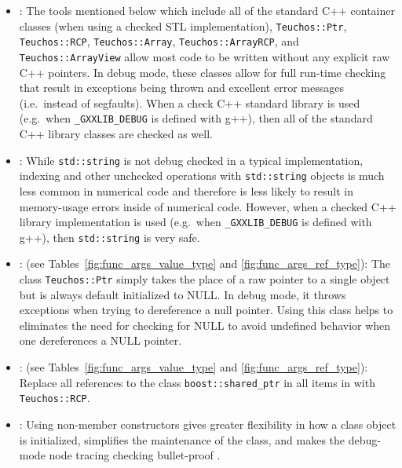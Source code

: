 \begin{itemize}


{}\item\GCGAvoidRawPointers: The tools mentioned below which include all of
the standard C++ container classes (when using a checked STL implementation),
{}\texttt{Teuchos::\-Ptr}, {}\texttt{Teuchos::\-RCP},
{}\texttt{Teuchos::\-Array}, {}\texttt{Teuchos::\-Array\-RCP}, and
{}\texttt{Teuchos::\-Array\-View} allow most code to be written without any
explicit raw C++ pointers.  In debug mode, these classes allow for full
run-time checking that result in exceptions being thrown and excellent error
messages (i.e.\ instead of segfaults).  When a check C++ standard library is
used (e.g.\ when {}\texttt{\_GXXLIB\_DEBUG} is defined with g++), then all of
the standard C++ library classes are checked as well.


{}\item\GCGUseStdString: While {}\texttt{std\-::string} is not debug checked
in a typical implementation, indexing and other unchecked operations with
{}\texttt{std\-::string} objects is much less common in numerical code and
therefore is less likely to result in memory-usage errors inside of numerical
code.  However, when a checked C++ library implementation is used (e.g.\ when
{}\texttt{\_GXXLIB\_DEBUG} is defined with g++), then {}\texttt{std\-::string}
is very safe.


{}\item\GCGTeuchosPtr: (see Tables~\ref{fig:func_args_value_type} and
{}\ref{fig:func_args_ref_type}): The class {}\texttt{Teuchos\-::Ptr} simply
takes the place of a raw pointer to a single object but is always default
initialized to NULL.  In debug mode, it throws exceptions when trying to
dereference a null pointer.  Using this class helps to eliminates the need for
checking for NULL to avoid undefined behavior when one dereferences a NULL
pointer.


{}\item\GCGTeuchosRCP: (see Tables~\ref{fig:func_args_value_type} and
{}\ref{fig:func_args_ref_type}): Replace all references to the class
{}\texttt{boost::\-shared\_ptr} in all items in {}\cite{C++CodingStandards05}
with {}\texttt{Teuchos::\-RCP}.


{}\item\GCGNonmemberConstructors: Using non-member constructors gives
greater flexibility in how a class object is initialized, simplifies
the maintenance of the class, and makes the debug-mode node tracing
checking bullet-proof {}\cite{TeuchosMemoryManagementGuide}.


\end{itemize}
